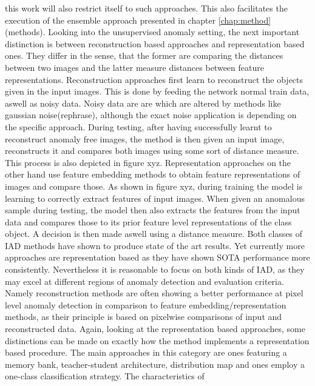 this work will also restrict itself to such approaches. This also facilitates the execution of the ensemble approach presented in chapter \ref{chap:method}(methods).
\newline
Looking into the unsupervised anomaly setting, the next important distinction is between reconstruction based approaches and representation based ones. They differ in the sense, that the former 
are comparing the distances between two images and the latter measure distances between feature representations. \newline
Reconstruction approaches first learn to reconstruct the objects given in the input images. This is done by feeding the network normal train data, aswell as noisy data. Noisy data are are 
which are altered by methods like gaussian noise(rephrase), although the exact noise application is depending on the specific approach. During testing, after having successfully learnt to 
reconstruct anomaly free images, the method is then given an input image, reconstructs it and compares both images using some sort of distance measure. This process is also depicted in figure xyz. 
Representation approaches on the other hand use feature embedding methods to obtain feature representations of images and compare those. As shown in figure xyz, during training the model is 
learning to correctly extract features of input images. When given an anomalous sample during testing, the model then also extracts the features from the input data and compares those to its 
prior feature level representations of the class object. A decision is then made aswell using a distance measure.
Both classes of IAD methods have shown to produce state of the art results. Yet currently more approaches are representation based \cite{liu2024deep} as they have shown SOTA performance more 
consistently. Nevertheless it is reasonable to focus on both kinds of IAD, as they may excel at different regions of anomaly detection and evaluation criteria. Namely reconstruction methods are 
often showing a better performance at pixel level anomaly detection in comparison to feature embedding/representation methods, as their principle is based on pixelwise comparisons of input 
and reconstructed data.
\newline
Again, looking at the representation based approaches, some distinctions can be made on exactly how the method implements a representation based procedure.
The main approaches in this category are ones featuring a memory bank, teacher-student architecture, distribution map and ones employ a one-class classification strategy. The characteristics of 
